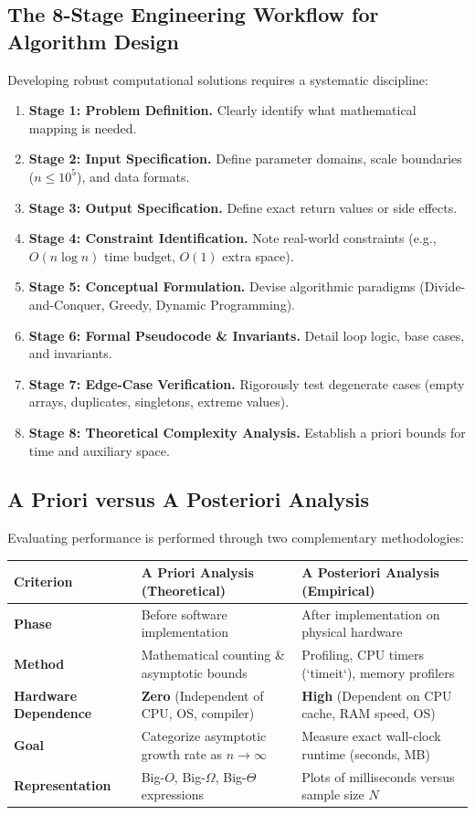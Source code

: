 \documentclass[11pt,a4paper]{article}
\begin{document}
\subsection{The 8-Stage Engineering Workflow for Algorithm Design}
Developing robust computational solutions requires a systematic discipline:
\begin{enumerate}[leftmargin=2.2em, itemsep=2pt]
    \item \textbf{Stage 1: Problem Definition.} Clearly identify what mathematical mapping is needed.
    \item \textbf{Stage 2: Input Specification.} Define parameter domains, scale boundaries ($n \le 10^5$), and data formats.
    \item \textbf{Stage 3: Output Specification.} Define exact return values or side effects.
    \item \textbf{Stage 4: Constraint Identification.} Note real-world constraints (e.g., $O(n \log n)$ time budget, $O(1)$ extra space).
    \item \textbf{Stage 5: Conceptual Formulation.} Devise algorithmic paradigms (Divide-and-Conquer, Greedy, Dynamic Programming).
    \item \textbf{Stage 6: Formal Pseudocode \& Invariants.} Detail loop logic, base cases, and invariants.
    \item \textbf{Stage 7: Edge-Case Verification.} Rigorously test degenerate cases (empty arrays, duplicates, singletons, extreme values).
    \item \textbf{Stage 8: Theoretical Complexity Analysis.} Establish a priori bounds for time and auxiliary space.
\end{enumerate}

\subsection{A Priori versus A Posteriori Analysis}
Evaluating performance is performed through two complementary methodologies:

\begin{center}
\begin{tabularx}{\textwidth}{p{3.5cm} X X}
\toprule
\textbf{Criterion} & \textbf{A Priori Analysis (Theoretical)} & \textbf{A Posteriori Analysis (Empirical)} \\
\midrule
\textbf{Phase} & Before software implementation & After implementation on physical hardware \\
\textbf{Method} & Mathematical counting \& asymptotic bounds & Profiling, CPU timers (`timeit`), memory profilers \\
\textbf{Hardware Dependence} & \textbf{Zero} (Independent of CPU, OS, compiler) & \textbf{High} (Dependent on CPU cache, RAM speed, OS) \\
\textbf{Goal} & Categorize asymptotic growth rate as $n \to \infty$ & Measure exact wall-clock runtime (seconds, MB) \\
\textbf{Representation} & Big-$O$, Big-$\Omega$, Big-$\Theta$ expressions & Plots of milliseconds versus sample size $N$ \\
\bottomrule
\end{tabularx}
\end{center}
\end{document}
